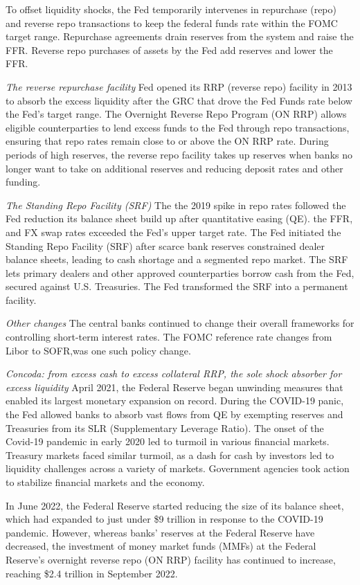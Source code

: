 \documentclass[
]{article}
\begin{document}
To offset liquidity shocks, the Fed temporarily intervenes in repurchase (repo) and reverse repo transactions to keep the federal funds rate within the FOMC target range. Repurchase agreements drain reserves from the system and raise the FFR. Reverse repo purchases of assets by the Fed add reserves and lower the FFR.

\emph{The reverse repurchase facility}
Fed opened its RRP (reverse repo) facility in 2013 to absorb the excess liquidity after the GRC that drove the Fed Funds rate below the Fed's target range. The Overnight Reverse Repo Program (ON RRP) allows eligible counterparties to lend excess funds to the Fed through repo transactions, ensuring that repo rates remain close to or above the ON RRP rate. During periods of high reserves, the reverse repo facility takes up reserves when banks no longer want to take on additional reserves and reducing deposit rates and other funding.

\emph{The Standing Repo Facility (SRF)}
The the 2019 spike in repo rates followed the Fed reduction its balance sheet build up after quantitative easing (QE). the FFR, and FX swap rates exceeded the Fed's upper target rate. The Fed initiated the Standing Repo Facility (SRF) after scarce bank reserves constrained dealer balance sheets, leading to cash shortage and a segmented repo market. The SRF lets primary dealers and other approved counterparties borrow cash from the Fed, secured against U.S. Treasuries. The Fed transformed the SRF into a permanent facility.

\emph{Other changes}
The central banks continued to change their overall frameworks for controlling short-term interest rates.
The FOMC reference rate changes from Libor to SOFR,was one such policy change.

\emph{Concoda: from excess cash to excess collateral RRP, the sole shock absorber for excess liquidity}
April 2021, the Federal Reserve began unwinding measures that enabled its largest monetary expansion on record. During the COVID-19 panic, the Fed allowed banks to absorb vast flows from QE by exempting reserves and Treasuries from its SLR (Supplementary Leverage Ratio). The onset of the Covid-19 pandemic in early 2020 led to turmoil in various financial markets. Treasury markets faced similar turmoil, as a dash for cash by investors led to liquidity challenges across a variety of markets. Government agencies took action to stabilize financial markets and the economy.

In June 2022, the Federal Reserve started reducing the size of its balance sheet, which had expanded to
just under \$9 trillion in response to the COVID-19 pandemic. However, whereas banks' reserves at the
Federal Reserve have decreased, the investment of money market funds (MMFs) at the Federal Reserve's
overnight reverse repo (ON RRP) facility has continued to increase, reaching \$2.4 trillion in September
2022.
\end{document}
